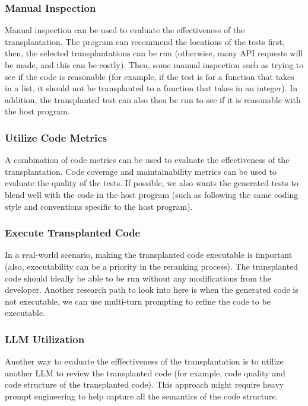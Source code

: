 \documentclass[sigconf]{acmart}
\begin{document}
\subsubsection{Manual Inspection}\label{sec:manual-inspection}
Manual inspection can be used to evaluate the effectiveness of the transplantation. The program can recommend the locations of the tests first, then, the selected transplantations can be run (otherwise, many API requests will be made, and this can be costly). Then, some manual inspection such as trying to see if the code is reasonable (for example, if the test is for a function that takes in a list, it should not be transplanted to a function that takes in an integer). In addition, the transplanted test can also then be run to see if it is reasonable with the host program.

\subsubsection{Utilize Code Metrics}\label{sec:utilize-code-metrics}
A combination of code metrics can be used to evaluate the effectiveness of the transplantation. Code coverage and maintainability metrics can be used to evaluate the quality of the tests. If possible, we also wants the generated tests to blend well with the code in the host program (such as following the same coding style and conventions specific to the host program).

\subsubsection{Execute Transplanted Code}\label{sec:execute-transplanted-code}
In a real-world scenario, making the transplanted code executable is important (also, executability can be a priority in the reranking process). The transplanted code should ideally be able to be run without any modifications from the developer. Another research path to look into here is when the generated code is not executable, we can use multi-turn prompting to refine the code to be executable.

\subsubsection{LLM Utilization}\label{sec:llm-utilization}
Another way to evaluate the efffectiveness of the transplantation is to utilize another LLM to review the transplanted code (for example, code quality and code structure of the transplanted code). This approach might require heavy prompt engineering to help capture all the semantics of the code structure.



\end{document}
